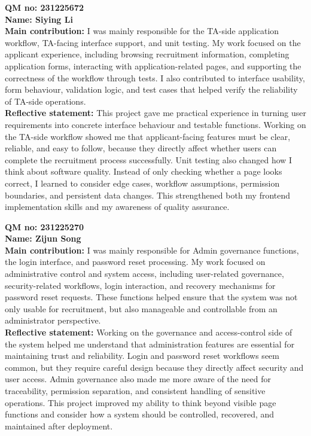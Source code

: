 \documentclass[11pt,a4paper]{article}
\begin{document}
{\vspace{6pt}

\textbf{QM no: 231225672}\\
\textbf{Name: Siying Li}\\
\textbf{Main contribution:} I was mainly responsible for the TA-side application workflow, TA-facing interface support, and unit testing. My work focused on the applicant experience, including browsing recruitment information, completing application forms, interacting with application-related pages, and supporting the correctness of the workflow through tests. I also contributed to interface usability, form behaviour, validation logic, and test cases that helped verify the reliability of TA-side operations.\\
\textbf{Reflective statement:} This project gave me practical experience in turning user requirements into concrete interface behaviour and testable functions. Working on the TA-side workflow showed me that applicant-facing features must be clear, reliable, and easy to follow, because they directly affect whether users can complete the recruitment process successfully. Unit testing also changed how I think about software quality. Instead of only checking whether a page looks correct, I learned to consider edge cases, workflow assumptions, permission boundaries, and persistent data changes. This strengthened both my frontend implementation skills and my awareness of quality assurance.

\vspace{6pt}

\textbf{QM no: 231225270}\\
\textbf{Name: Zijun Song}\\
\textbf{Main contribution:} I was mainly responsible for Admin governance functions, the login interface, and password reset processing. My work focused on administrative control and system access, including user-related governance, security-related workflows, login interaction, and recovery mechanisms for password reset requests. These functions helped ensure that the system was not only usable for recruitment, but also manageable and controllable from an administrator perspective.\\
\textbf{Reflective statement:} Working on the governance and access-control side of the system helped me understand that administration features are essential for maintaining trust and reliability. Login and password reset workflows seem common, but they require careful design because they directly affect security and user access. Admin governance also made me more aware of the need for traceability, permission separation, and consistent handling of sensitive operations. This project improved my ability to think beyond visible page functions and consider how a system should be controlled, recovered, and maintained after deployment.

}
\end{document}
